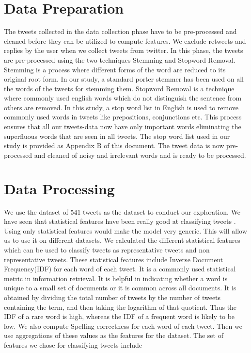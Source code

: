 \section{Data Preparation}
The tweets collected in the data collection phase have to be pre-processed and cleaned before they can be utilized to compute features. We exclude retweets and replies by the user when we collect tweets from twitter. In this phase, the tweets are pre-processed using the two techniques Stemming and Stopword Removal. Stemming is a process where different forms of the word are reduced to its original root form. In our study, a standard porter stemmer has been used on all the words of the tweets for stemming them. Stopword Removal is a technique where commonly used english words which do not distinguish the sentence from others are removed. In this study, a stop word list in English is used to remove commonly used words in tweets like prepositions, conjunctions etc. This process ensures that all our tweets-data now have only important words eliminating  the superfluous  words that are seen in all tweets. The stop word list used in our study is provided as Appendix B of this document. The tweet data is now pre-processed and cleaned of noisy and irrelevant words and is ready to be processed. 

\section{Data Processing}
We use the dataset of 541 tweets as the dataset to conduct our exploration. We have seen that statistical features have been really good at classifying tweets \cite{Sriram:2010:STC:1835449.1835643} \cite{Sakaki:2010:EST:1772690.1772777}. Using only statistical features would make the model very generic. This will allow us to use it on different datasets. We calculated the different statistical features which can be used to classify tweets as representative tweets and non representative tweets. These statistical features include Inverse Document Frequency(IDF) for each word of each tweet.  It is a commonly used statistical metric in information retrieval. It is helpful in indicating whether a word is unique to a small set of documents or it is common across all documents. It is obtained by dividing the total number of tweets by the number of tweets containing the term, and then taking the logarithm of that quotient. Thus the IDF of a rare word is high, whereas the IDF of a frequent word is likely to be low. We also compute Spelling correctness for each word of each tweet. Then we use aggregations of these values as the features for the dataset. The set of features we chose for classifying tweets include

